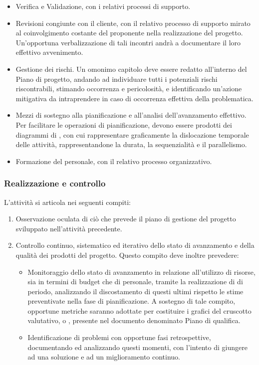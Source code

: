 \begin{enumerate}
\begin{itemize}
        \item Verifica e Validazione, con i relativi processi di supporto.
        \item Revisioni congiunte con il cliente, con il relativo processo di supporto mirato al coinvolgimento costante del proponente nella realizzazione del progetto. Un'opportuna verbalizzazione di tali incontri andrà a documentare il loro effettivo avvenimento.
        \item Gestione dei rischi. Un omonimo capitolo deve essere redatto all'interno del Piano di progetto, andando ad individuare tutti i potenziali rischi riscontrabili, stimando occorrenza e pericolosità, e identificando un'azione mitigativa da intraprendere in caso di occorrenza effettiva della problematica.
        \item Mezzi di sostegno alla pianificazione e all'analisi dell'avanzamento effettivo. Per facilitare le operazioni di pianificazione, devono essere prodotti dei diagrammi di , con cui rappresentare graficamente la dislocazione temporale delle attività, rappresentandone la durata, la sequenzialità e il parallelismo.
        \item Formazione del personale, con il relativo processo organizzativo.
    \end{itemize}
\end{enumerate}

\subsubsection{Realizzazione e controllo}
L'attività si articola nei seguenti compiti:
\begin{enumerate}
    \item Osservazione oculata di ciò che prevede il piano di gestione del progetto sviluppato nell'attività precedente.
    \item Controllo continuo, sistematico ed iterativo dello stato di avanzamento e della qualità dei prodotti del progetto. Questo compito deve inoltre prevedere:
    \begin{itemize}
        \item Monitoraggio dello stato di avanzamento in relazione all'utilizzo di risorse, sia in termini di budget che di personale, tramite la realizzazione di  di periodo, analizzando il discostamento di questi ultimi rispetto le stime preventivate nella fase di pianificazione. A sostegno di tale compito, opportune metriche saranno adottate per costituire i grafici del cruscotto valutativo, o , presente nel documento denominato Piano di qualifica.
        \item Identificazione di problemi con opportune fasi retrospettive, documentando ed analizzando questi momenti, con l'intento di giungere ad una soluzione e ad un miglioramento continuo.
    \end{itemize}
\end{enumerate}

